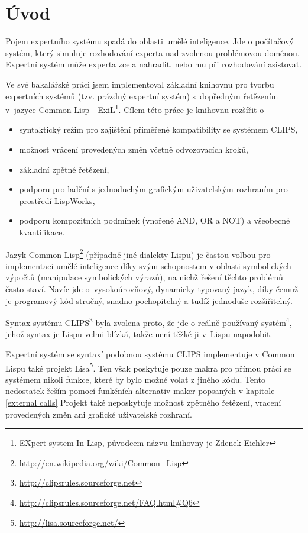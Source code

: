 \section{Úvod}

Pojem expertního systému spadá do oblasti umělé inteligence. Jde o počítačový
systém, který simuluje rozhodování experta nad zvolenou problémovou doménou.
Expertní systém může experta zcela nahradit, nebo mu při rozhodování asistovat.

Ve své bakalářské práci \cite{bakalarka} jsem implementoval základní knihovnu
pro tvorbu expertních systémů (tzv. prázdný expertní systém) s~dopředným
řetězením v~jazyce Common Lisp - ExiL\footnote{EXpert system In Lisp, původcem
  názvu knihovny je Zdenek Eichler}. Cílem této práce je knihovnu rozšířit o
\begin{itemize}
  \item syntaktický režim pro zajištění přiměřené kompatibility se systémem
    CLIPS,
  \item možnost vrácení provedených změn včetně odvozovacích kroků,
  \item základní zpětné řetězení,
  \item podporu pro ladění s jednoduchým grafickým uživatelským rozhraním pro
    prostředí LispWorks\texttrademark,
  \item podporu kompozitních podmínek (vnořené AND, OR a NOT) a všeobecné
    kvantifikace.
\end{itemize}

Jazyk Common Lisp\footnote{\url{http://en.wikipedia.org/wiki/Common\_Lisp}}
(případně jiné dialekty Lispu) je častou volbou pro implementaci umělé
inteligence díky svým schopnostem v oblasti symbolických výpočtů (manipulace
symbolických výrazů), na nichž řešení těchto problémů často staví. Navíc jde
o~vysokoúrovňový, dynamicky typovaný jazyk, díky čemuž je programový kód
stručný, snadno pochopitelný a tudíž jednoduše rozšiřitelný.

Syntax systému CLIPS\footnote{\url{http://clipsrules.sourceforge.net}} byla
zvolena proto, že jde o reálně používaný
systém\footnote{\url{http://clipsrules.sourceforge.net/FAQ.html\#Q6}}, jehož
syntax je Lispu velmi blízká, takže není těžké ji v~Lispu napodobit.

Expertní systém se syntaxí podobnou systému CLIPS implementuje v Common Lispu
také projekt Lisa\footnote{\url{http://lisa.sourceforge.net/}}. Ten však
poskytuje pouze makra pro přímou práci se systémem nikoli funkce, které by bylo
možné volat z jiného kódu. Tento nedostatek řeším pomocí funkčních alternativ
maker popsaných v kapitole \ref{external calls} Projekt také neposkytuje možnost
zpětného řetězení, vracení provedených změn ani grafické uživatelské rozhraní.

